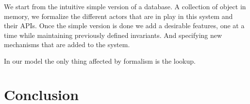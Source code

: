 \documentclass[parallelisme]{compas2022}
\begin{document}
We start from the intuitive simple version of a database.
A collection of object in memory, we formalize the different actors that are in play in this system and their APIs.
Once the simple version is done we add a desirable features, one at a time while maintaining previously defined invariants.
And specifying new mechanisms that are added to the system.



In our model the only thing affected by formalism is the lookup.

\section{Conclusion}



\end{document}
